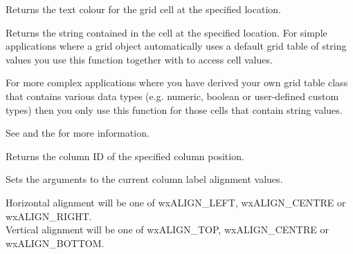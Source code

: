 Returns the text colour for the grid cell at the specified location.



\label{wxgridgetcellvalue}



Returns the string contained in the cell at the specified location. For simple applications where a
grid object automatically uses a default grid table of string values you use this function together
with  to access cell values.

For more complex applications where you have derived your own grid table class that contains
various data types (e.g. numeric, boolean or user-defined custom types) then you only use this
function for those cells that contain string values.

See 
and the  for more information.



\label{wxgridgetcolat}


Returns the column ID of the specified column position.


\label{wxgridgetcolleft}




\label{wxgridgetcollabelalignment}


Sets the arguments to the current column label alignment values.

Horizontal alignment will be one of wxALIGN\_LEFT, wxALIGN\_CENTRE or wxALIGN\_RIGHT.\\
Vertical alignment will be one of wxALIGN\_TOP, wxALIGN\_CENTRE or wxALIGN\_BOTTOM.




